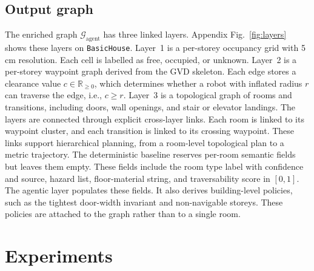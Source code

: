 \documentclass[a4paper, 10pt, conference]{ieeeconf}
\begin{document}
\subsection{Output graph}

The enriched graph $\mathcal{G}_{\text{agent}}$ has three linked layers. Appendix Fig.~\ref{fig:layers} shows these layers on \texttt{BasicHouse}. Layer~1 is a per-storey occupancy grid with 5\,cm resolution. Each cell is labelled as free, occupied, or unknown. Layer~2 is a per-storey waypoint graph derived from the GVD skeleton. Each edge stores a clearance value $c\in\mathbb{R}_{\geq 0}$, which determines whether a robot with inflated radius $r$ can traverse the edge, i.e., $c\geq r$. Layer~3 is a topological graph of rooms and transitions, including doors, wall openings, and stair or elevator landings. The layers are connected through explicit cross-layer links. Each room is linked to its waypoint cluster, and each transition is linked to its crossing waypoint. These links support hierarchical planning, from a room-level topological plan to a metric trajectory. The deterministic baseline reserves per-room semantic fields but leaves them empty. These fields include the room type label with confidence and source, hazard list, floor-material string, and traversability score in $[0,1]$. The agentic layer populates these fields. It also derives building-level policies, such as the tightest door-width invariant and non-navigable storeys. These policies are attached to the graph rather than to a single room.

\section{Experiments}
\end{document}
